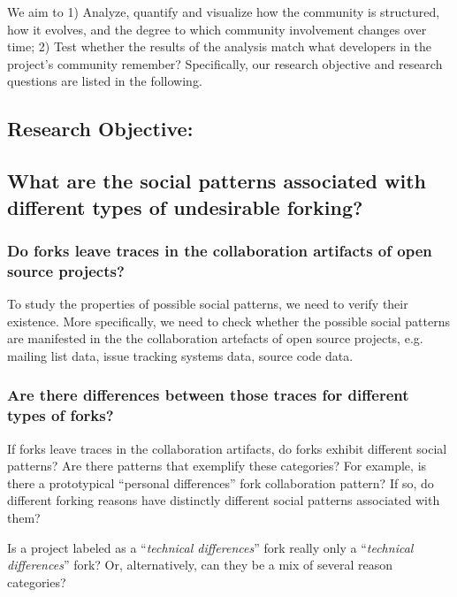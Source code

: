 \documentclass{acm_proc_article-sp}
\begin{document}
We aim to 1) Analyze, quantify and visualize how the community is structured, how it evolves, and the degree to which community involvement changes over time; 2) Test whether the results of the analysis match what developers in the project's community remember? 
Specifically, our research objective and research questions are listed in the following.\\

\subsection{Research Objective:}
\label{ResearchObjective}
\subsection*{What are the social patterns associated with different types of undesirable forking?\\}

\subsubsection{Do forks leave traces in the collaboration artifacts of open source projects?\\}

To study the properties of possible social patterns, we need to verify their existence. More specifically, we need to check whether the possible social patterns are manifested in the the collaboration artefacts of open source projects, e.g. mailing list data, issue tracking systems data, source code data.

\subsubsection{Are there differences between those traces for different types of forks?\\}

If forks leave traces in the collaboration artifacts, do forks exhibit different social patterns? Are there patterns that exemplify these categories? For example, is there a prototypical ``personal differences'' fork collaboration pattern? If so, do different forking reasons have distinctly different social patterns associated with them? 

Is a project labeled as a ``\textit{technical differences}'' fork really only a ``\textit{technical differences}'' fork? Or, alternatively, can they be a mix of several reason categories?
\end{document}

